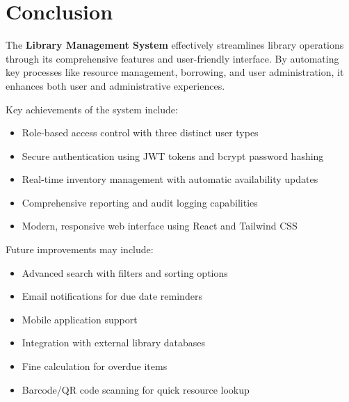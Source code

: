 \documentclass[11pt,a4paper]{article}
\begin{document}
\section{Conclusion}

The \textbf{Library Management System} effectively streamlines library operations through its comprehensive features and user-friendly interface. By automating key processes like resource management, borrowing, and user administration, it enhances both user and administrative experiences.

Key achievements of the system include:
\begin{itemize}
    \item Role-based access control with three distinct user types
    \item Secure authentication using JWT tokens and bcrypt password hashing
    \item Real-time inventory management with automatic availability updates
    \item Comprehensive reporting and audit logging capabilities
    \item Modern, responsive web interface using React and Tailwind CSS
\end{itemize}

Future improvements may include:
\begin{itemize}
    \item Advanced search with filters and sorting options
    \item Email notifications for due date reminders
    \item Mobile application support
    \item Integration with external library databases
    \item Fine calculation for overdue items
    \item Barcode/QR code scanning for quick resource lookup
\end{itemize}
\end{document}
